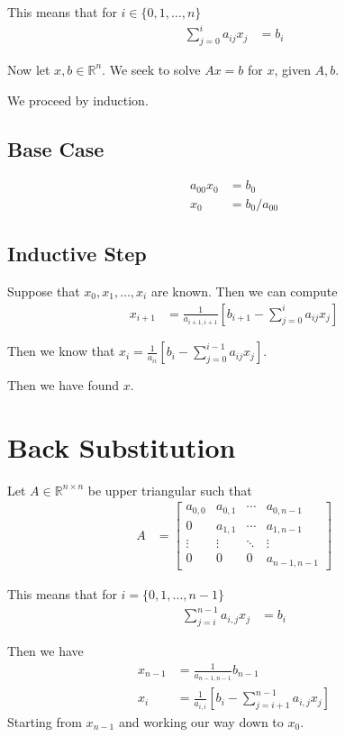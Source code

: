 \documentclass{article}
\begin{document}
This means that for $i \in \{0, 1, \ldots, n \}$
\begin{align*}
    \sum_{j=0}^i a_{ij} x_j &= b_i
\end{align*}

Now let $x, b \in \mathbb{R}^n$.
We seek to solve $A x = b$ for $x$, given $A,b$.

We proceed by induction.

\subsection{Base Case}
\begin{align*}
    a_{00} x_0 &= b_0 \\
    x_0 &= b_0 / a_{00}
\end{align*}

\subsection{Inductive Step}
Suppose that $x_0, x_1, \ldots, x_i$ are known.
Then we can compute
\begin{align*}
    x_{i+1} &= \frac{1}{a_{i+1,i+1}} \left[ b_{i+1} - \sum_{j=0}^{i} a_{ij} x_j \right]
\end{align*}

Then we know that $x_i = \frac{1}{a_{ii}} \left[ b_i - \sum_{j=0}^{i-1} a_{ij} x_j \right]$.

Then we have found $x$.

\section{Back Substitution}
Let $A \in \mathbb{R}^{n \times n}$ be upper triangular such that
\begin{align*}
    A &= \begin{bmatrix}
        a_{0,0} & a_{0,1} & \cdots & a_{0,n-1} \\
        0 & a_{1,1} & \cdots & a_{1,n-1} \\
        \vdots & \vdots & \ddots & \vdots \\
        0 & 0 & 0 & a_{n-1,n-1}
    \end{bmatrix}
\end{align*}

This means that for $i = \{0, 1, \ldots, n-1 \}$
\begin{align*}
    \sum_{j=i}^{n-1} a_{i,j} x_j &= b_i
\end{align*}

Then we have
\begin{align*}
    x_{n-1} &= \frac{1}{a_{n-1,n-1}} b_{n-1} \\
    x_i &= \frac{1}{a_{i,i}} \left[ b_i - \sum_{j=i+1}^{n-1} a_{i,j} x_j \right]
\end{align*}
Starting from $x_{n-1}$ and working our way down to $x_0$.
\end{document}

